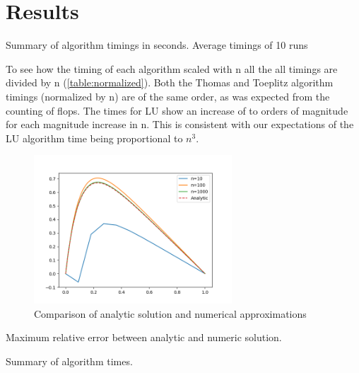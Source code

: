 \section*{Results}

\begin{table}[htp]
  \centering
  \caption{Summary of algorithm timings in seconds. Average timings of 10 runs}
  \label{table:normalized}
\end{table}


To see how the timing of each algorithm scaled with n all the
all timings are divided by n (\cref{table:normalized}). Both the Thomas and
Toeplitz algorithm timings (normalized by n) are of the same order, as was
expected from the counting of flops. The times for LU show an increase of to
orders of magnitude for each magnitude increase in n. This is consistent with
our expectations of the LU algorithm time being proportional to $n^3$.



\begin{figure}[H]
  \centering
  \includegraphics[width=0.66\textwidth]{../figures/thomas.png}
  \caption{Comparison of analytic solution and numerical approximations}
  \label{fig:a}
\end{figure}


\begin{table}[htp]
  \centering
  \caption{Maximum relative error between analytic and numeric solution.}
  \label{table:relative_error}
\end{table}


\begin{table}[htp]
  \centering
  \caption{Summary of algorithm times.}
  \label{table:summary}
\end{table}


